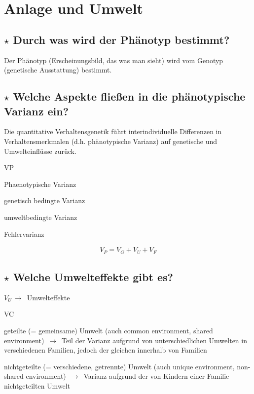 \documentclass[a4paper,9pt,DIV=14]{scrartcl}
\begin{document}
\section{Anlage und Umwelt}
\subsection{$\star$ Durch was wird der Phänotyp bestimmt?} %
Der Phänotyp (Erscheinungsbild, das was man sieht) wird vom Genotyp (genetische Ausstattung) bestimmt.

\subsection{$\star$ Welche Aspekte fließen in die phänotypische Varianz ein?} %

Die quantitative Verhaltensgenetik führt interindividuelle Differenzen in Verhaltensmerkmalen (d.h. phänotypische Varianz) auf genetische und Umwelteinflüsse zurück.

\begin{labeling}{VP}
\item [VP] Phaenotypische Varianz 
\item [VG] genetisch bedingte Varianz
\item [VU] umweltbedingte Varianz
\item [VF] Fehlervarianz
\end{labeling}

\begin{align*}
 V_P = V_G + V_U + V_F
\end{align*}

\subsection{$\star$ Welche Umwelteffekte gibt es?} %
$V_U \,\to\,$ Umwelteffekte
\begin{labeling}{VC}
\item [$V_C$] geteilte (= gemeinsame) Umwelt (auch common environment, shared
environment) $\,\to\,$ Teil der Varianz aufgrund von unterschiedlichen Umwelten in
verschiedenen Familien, jedoch der gleichen innerhalb von Familien

\item [$V_E$] nichtgeteilte (= verschiedene, getrennte) Umwelt (auch unique
environment, non-shared environment) $\,\to\,$ Varianz aufgrund der von Kindern
einer Familie nichtgeteilten Umwelt
\end{labeling}
\end{document}
